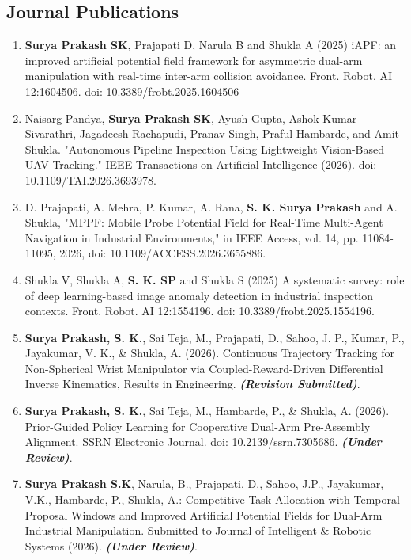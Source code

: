 \begin{Publications}

\pubpagenum

\section*{Journal Publications}
\begin{enumerate}
\item \textbf{Surya Prakash SK}, Prajapati D, Narula B and Shukla A (2025) iAPF: an improved artificial potential field framework for asymmetric dual-arm manipulation with real-time inter-arm collision avoidance. Front. Robot. AI 12:1604506. doi: 10.3389/frobt.2025.1604506
\item Naisarg Pandya, \textbf{Surya Prakash SK}, Ayush Gupta, Ashok Kumar Sivarathri, Jagadeesh Rachapudi, Pranav Singh, Praful Hambarde, and Amit Shukla. "Autonomous Pipeline Inspection Using Lightweight Vision-Based UAV Tracking." IEEE Transactions on Artificial Intelligence (2026). doi: 10.1109/TAI.2026.3693978.
\item D. Prajapati, A. Mehra, P. Kumar, A. Rana, \textbf{S. K. Surya Prakash} and A. Shukla, "MPPF: Mobile Probe Potential Field for Real-Time Multi-Agent Navigation in Industrial Environments," in IEEE Access, vol. 14, pp. 11084-11095, 2026, doi: 10.1109/ACCESS.2026.3655886.

\item Shukla V, Shukla A, \textbf{S. K. SP} and Shukla S (2025) A systematic survey: role of deep learning-based image anomaly detection in industrial inspection contexts. Front. Robot. AI 12:1554196. doi: 10.3389/frobt.2025.1554196.

\item \textbf{Surya Prakash, S. K.}, Sai Teja, M., Prajapati, D., Sahoo, J. P., Kumar, P., Jayakumar, V. K., \& Shukla, A. (2026). Continuous Trajectory Tracking for Non-Spherical Wrist Manipulator via Coupled-Reward-Driven Differential Inverse Kinematics, Results in Engineering. \textbf{\textit{(Revision Submitted)}}.

\item \textbf{Surya Prakash, S. K.}, Sai Teja, M., Hambarde, P., \& Shukla, A. (2026). Prior-Guided Policy Learning for Cooperative Dual-Arm Pre-Assembly Alignment. SSRN Electronic Journal. doi: 10.2139/ssrn.7305686. \textbf{\textit{(Under Review)}}.

\item \textbf{Surya Prakash S.K}, Narula, B., Prajapati, D., Sahoo, J.P., Jayakumar, V.K., Hambarde, P., Shukla, A.: Competitive Task Allocation with Temporal Proposal Windows and Improved Artificial Potential Fields for Dual-Arm Industrial Manipulation. Submitted to Journal of Intelligent \& Robotic Systems (2026). \textbf{\textit{(Under Review)}}.


\end{enumerate}
\end{Publications}

